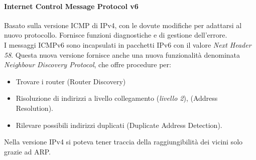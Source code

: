 \documentclass{article}
\begin{document}
\paragraph{Internet Control Message Protocol v6}
Basato sulla versione ICMP di IPv4, con le dovute modifiche per adattarsi al nuovo protocollo. Fornisce funzioni diagnostiche e di gestione dell'errore.\\
I messaggi ICMPv6 sono incapsulati in pacchetti IPv6 con il valore \textit{Next Header 58}. Questa nuova versione fornisce anche una nuova funzionalità denominata \textit{Neighbour Discovery Protocol}, che offre procedure per:
\begin{itemize}
    \item Trovare i router (Router Discovery)
    \item Risoluzione di indirizzi a livello collegamento (\textit{livello 2}), (Address Resolution).
    \item Rilevare possibili indirizzi duplicati (Duplicate Address Detection).
\end{itemize}
Nella versione IPv4 si poteva tener traccia della raggiungibilità dei vicini solo grazie ad ARP.
\end{document}
